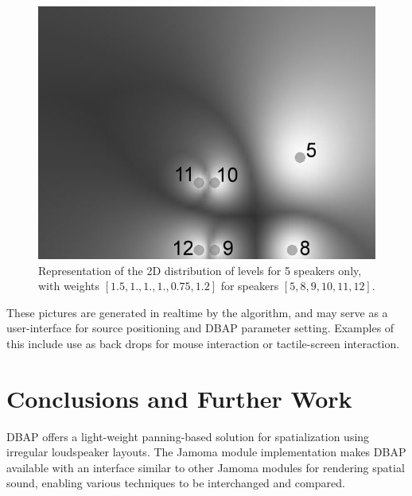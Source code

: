 \documentclass[twoside,10pt]{article}
\begin{document}
\begin{figure}[ht]
\centerline{\includegraphics[scale=0.5]{spk_groups+nbrs}}
\caption{Representation of the 2D distribution of levels for 5 speakers only, with weights $[1.5,1.,1.,1.,0.75,1.2]$ for speakers $[5,8,9,10,11,12]$.}
\label{fig:5spk_weights}
\end{figure}
These pictures are generated in realtime by the algorithm, and may serve as a user-interface for source positioning and DBAP parameter setting.  Examples of this include use as back drops for mouse interaction or tactile-screen interaction.


\section{Conclusions and Further Work}

DBAP offers a light-weight panning-based solution for spatialization using irregular loudspeaker layouts. The Jamoma module implementation makes DBAP available with an interface similar to other Jamoma modules for rendering spatial sound, enabling various techniques to be interchanged and compared. %
\end{document}
